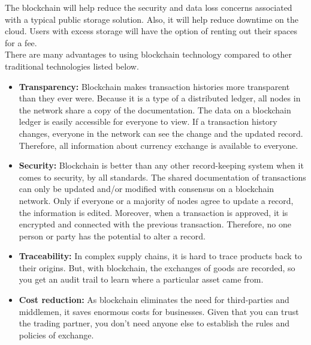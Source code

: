 The blockchain will help reduce the security and data loss concerns associated with a typical public storage solution. Also, it will help reduce downtime on the cloud. Users with excess storage will have the option of renting out their spaces for a fee. \\[-8pt]

\noindent
There are many advantages to using blockchain technology compared to other traditional technologies listed below. \\

\begin{itemize}
\item \textbf{Transparency: } Blockchain makes transaction histories more transparent than they ever were. Because it is a type of a distributed ledger, all nodes in the network share a copy of the documentation.  The data on a blockchain ledger is easily accessible for everyone to view. If a transaction history changes, everyone in the network can see the change and the updated record. Therefore, all information about currency exchange is available to everyone. \\
\item \textbf{Security: } Blockchain is better than any other record-keeping system when it comes to security, by all standards. The shared documentation of transactions can only be updated and/or modified with consensus on a blockchain network. Only if everyone or a majority of nodes agree to update a record, the information is edited. Moreover, when a transaction is approved, it is encrypted and connected with the previous transaction. Therefore, no one person or party has the potential to alter a record.\\
\item \textbf{Traceability: } In complex supply chains, it is hard to trace products back to their origins. But, with blockchain, the exchanges of goods are recorded, so you get an audit trail to learn where a particular asset came from.\\
\item \textbf{Cost reduction: } As blockchain eliminates the need for third-parties and middlemen, it saves enormous costs for businesses. Given that you can trust the trading partner, you don’t need anyone else to establish the rules and policies of exchange.\\
\end{itemize}